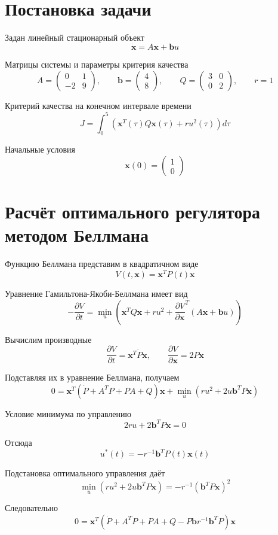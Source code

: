 
\section{Постановка задачи}

Задан линейный стационарный объект
\[
\dot{\bm x}=A\bm x+\bm b u
\]

Матрицы системы и параметры критерия качества
\[
A=\begin{pmatrix}
0&1\\
-2&9
\end{pmatrix},
\qquad
\bm b=\begin{pmatrix}4\\8\end{pmatrix},
\qquad
Q=\begin{pmatrix}3&0\\0&2\end{pmatrix},
\qquad r=1
\]

Критерий качества на конечном интервале времени
\[
J=\int_0^5
\left(
\bm x^T(\tau)Q\bm x(\tau)+ru^2(\tau)
\right)d\tau
\]

Начальные условия
\[
\bm x(0)=\begin{pmatrix}1\\0\end{pmatrix}
\]

\section{Расчёт оптимального регулятора методом Беллмана}

Функцию Беллмана представим в квадратичном виде
\[
V(t,\bm x)=\bm x^TP(t)\bm x
\]

Уравнение Гамильтона-Якоби-Беллмана имеет вид
\[
-\frac{\partial V}{\partial t}
=
\min_u
\left(
\bm x^TQ\bm x+ru^2+
\frac{\partial V}{\partial\bm x}^T
(A\bm x+\bm b u)
\right)
\]

Вычислим производные
\[
\frac{\partial V}{\partial t}
=\bm x^T\dot P\bm x,
\qquad
\frac{\partial V}{\partial\bm x}=2P\bm x
\]

Подставляя их в уравнение Беллмана, получаем
\[
0=\bm x^T(\dot P+A^TP+PA+Q)\bm x+
\min_u\left(ru^2+2u\bm b^TP\bm x\right)
\]

Условие минимума по управлению
\[
2ru+2\bm b^TP\bm x=0
\]

Отсюда
\[
u^*(t)=-r^{-1}\bm b^TP(t)\bm x(t)
\]

Подстановка оптимального управления даёт
\[
\min_u(ru^2+2u\bm b^TP\bm x)
=-r^{-1}(\bm b^TP\bm x)^2
\]

Следовательно
\[
0=\bm x^T
(\dot P+A^TP+PA+Q-P\bm b r^{-1}\bm b^TP)
\bm x
\]

